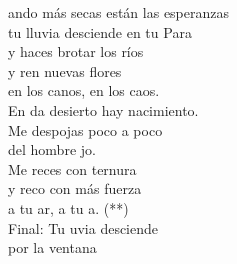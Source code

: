 \begin{cancion}%
	ando más secas están las esperanzas\\
	tu lluvia desciende en tu Para\\
	y haces brotar los ríos\\
	y ren nuevas flores\\
	en los canos, en los caos.\\
	En da desierto hay nacimiento.\\
Me despojas poco a poco \\
	del hombre jo.\\
	Me reces con ternura\\
	y reco con más fuerza\\
	a tu ar, a tu a. (**)\\
	Final: Tu uvia desciende \\
       por la ventana\\
\end{cancion}%
